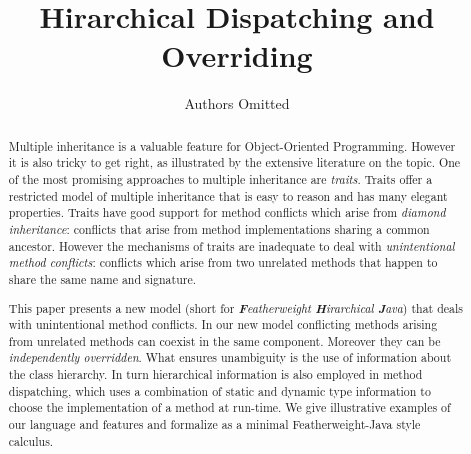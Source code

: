 \documentclass{llncs}
\begin{document}
\title{Hirarchical Dispatching and Overriding}

\author{Authors Omitted}

\institute{}

\maketitle

\begin{abstract}
Multiple inheritance is a valuable feature for Object-Oriented
Programming. However it is also tricky to get right, as illustrated by
the extensive literature on the topic. One of the most promising 
approaches to multiple inheritance are \emph{traits}. Traits offer a
restricted model of multiple inheritance that is easy to reason and 
has many elegant properties. Traits have good support for method 
conflicts which arise from \emph{diamond inheritance}:
conflicts that arise from method implementations sharing a common 
ancestor. However the mechanisms of traits are inadequate to deal 
with \emph{unintentional method conflicts}: conflicts which 
arise from two unrelated methods that happen to share the same name
and signature. 

This paper presents a new model \name{} 
(short for \emph{\textbf{F}eatherweight \textbf{H}irarchical \textbf{J}ava}) 
that deals with unintentional
method conflicts. In our new model conflicting methods arising
from unrelated methods can coexist in the same component. Moreover they
can be \emph{independently overridden}. What ensures unambiguity 
is the use of information about the class hierarchy. In turn
hierarchical information is also employed in method dispatching, which 
uses a combination of static and dynamic type information to choose 
the implementation of a method at run-time. We give illustrative 
examples of our language and features and formalize \name{} as a minimal 
Featherweight-Java style calculus. 

\end{abstract}



\end{document}
